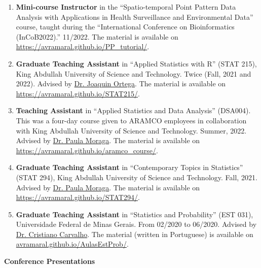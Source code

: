 \documentclass[11pt, ]{article}
\begin{document}
	\begin{enumerate}
		\item \textbf{Mini-course Instructor} in the ``Spatio-temporal Point Pattern Data Analysis with Applications in Health Surveillance and Environmental Data'' course, taught during the ``International Conference on Bioinformatics (InCoB2022).'' 11/2022. The material is available on  \href{https://avramaral.github.io/PP_tutorial/}{\url{https://avramaral.github.io/PP_tutorial/}}.
		
		\item \textbf{Graduate Teaching Assistant} in ``Applied Statistics with R'' (STAT 215), King Abdullah University of Science and Technology. Twice (Fall, 2021 and 2022). Advised by \href{https://cemse.kaust.edu.sa/people/person/joaquin-ortega-sanchez}{Dr. Joaquin Ortega}. The material is available on \href{https://avramaral.github.io/STAT215/}{\url{https://avramaral.github.io/STAT215/}}.
		
		\item \textbf{Teaching Assistant} in ``Applied Statistics and Data Analysis'' (DSA004). This was a four-day course given to ARAMCO employees in collaboration with King Abdullah University of Science and Technology. Summer, 2022. Advised by \href{https://www.paulamoraga.com/}{Dr. Paula Moraga}. The material is available on \href{https://avramaral.github.io/aramco\_course/}{\url{https://avramaral.github.io/aramco\_course/}}.
		
		\item \textbf{Graduate Teaching Assistant} in ``Contemporary Topics in Statistics'' (STAT 294), King Abdullah University of Science and Technology. Fall, 2021. Advised by \href{https://www.paulamoraga.com/}{Dr. Paula Moraga}. The material is available on \href{https://avramaral.github.io/STAT294/}{\url{https://avramaral.github.io/STAT294/}}.
		
		\item \textbf{Graduate Teaching Assistant} in ``Statistics and Probability'' (EST 031), Universidade Federal de Minas Gerais. From 02/2020 to 06/2020. Advised by \href{http://www.est.ufmg.br/~cristianocs/}{Dr. Cristiano Carvalho}. The material (written in Portuguese) is available on \href{https://avramaral.github.io/AulasEstProb/}{\url{avramaral.github.io/AulasEstProb/}}.
	\end{enumerate}

\vspace{6pt}

{\Large \textbf{Conference Presentations}}
\end{document}
